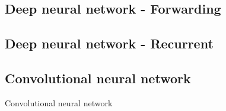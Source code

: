 \subsection{Deep neural network - Forwarding}
\subsection{Deep neural network - Recurrent}
\subsection{Convolutional neural network}
Convolutional neural network 